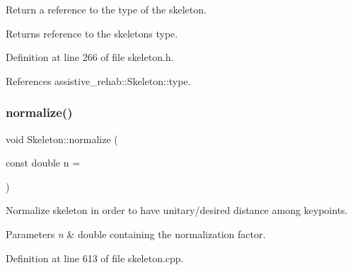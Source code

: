 Return a reference to the type of the skeleton. 

\begin{DoxyReturn}{Returns}
reference to the skeleton\textquotesingle{}s type. 
\end{DoxyReturn}


Definition at line 266 of file skeleton.\+h.


\begin{DoxyCode}{0}

\end{DoxyCode}


References assistive\+\_\+rehab\+::\+Skeleton\+::type.

\mbox{\label{classassistive__rehab_1_1Skeleton_a7753cc8d2b43e27eaf7bf9ef640a99cb}} 
\subsubsection{\texorpdfstring{normalize()}{normalize()}}
{\footnotesize\ttfamily void Skeleton\+::normalize (\begin{DoxyParamCaption}\item[{const double}]{n = {} }\end{DoxyParamCaption})\hspace{0.3cm}{\ttfamily [inherited]}}



Normalize skeleton in order to have unitary/desired distance among keypoints. 


\begin{DoxyParams}{Parameters}
{\em n} & double containing the normalization factor. \\
\hline
\end{DoxyParams}


Definition at line 613 of file skeleton.\+cpp.


\begin{DoxyCode}{0}

\end{DoxyCode}


